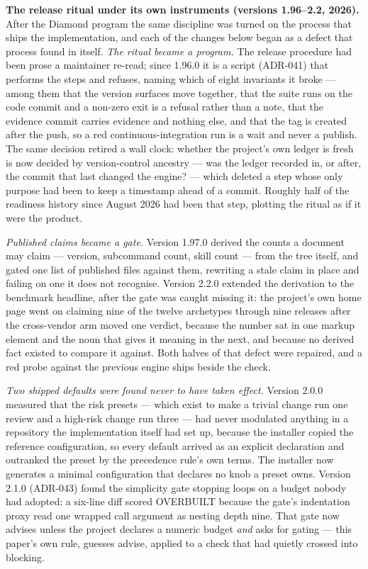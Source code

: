\documentclass[11pt]{article}
\begin{document}
\textbf{The release ritual under its own instruments (versions 1.96--2.2, 2026).}
After the Diamond program the same discipline was turned on the process that ships the
implementation, and each of the changes below began as a defect that process found in
itself. \emph{The ritual became a program.} The release procedure had been prose a
maintainer re-read; since 1.96.0 it is a script (ADR-041) that performs the steps and
refuses, naming which of eight invariants it broke --- among them that the version
surfaces move together, that the suite runs on the code commit and a non-zero exit is a
refusal rather than a note, that the evidence commit carries evidence and nothing else,
and that the tag is created after the push, so a red continuous-integration run is a
wait and never a publish. The same decision retired a wall clock: whether the project's
own ledger is fresh is now decided by version-control ancestry --- was the ledger
recorded in, or after, the commit that last changed the engine? --- which deleted a
step whose only purpose had been to keep a timestamp ahead of a commit. Roughly half of
the readiness history since August 2026 had been that step, plotting the ritual as if
it were the product.

\emph{Published claims became a gate.} Version 1.97.0 derived the counts a document may
claim --- version, subcommand count, skill count --- from the tree itself, and gated one
list of published files against them, rewriting a stale claim in place and failing on
one it does not recognise. Version 2.2.0 extended the derivation to the benchmark
headline, after the gate was caught missing it: the project's own home page went on
claiming nine of the twelve archetypes through nine releases after the cross-vendor arm
moved one verdict, because the number sat in one markup element and the noun that gives
it meaning in the next, and because no derived fact existed to compare it against. Both halves of
that defect were repaired, and a red probe against the previous engine ships beside the
check.

\emph{Two shipped defaults were found never to have taken effect.} Version 2.0.0
measured that the risk presets --- which exist to make a trivial change run one review
and a high-risk change run three --- had never modulated anything in a repository the
implementation itself had set up, because the installer copied the reference
configuration, so every default arrived as an explicit declaration and outranked the
preset by the precedence rule's own terms. The installer now generates a minimal
configuration that declares no knob a preset owns. Version 2.1.0 (ADR-043) found the
simplicity gate stopping loops on a budget nobody had adopted: a six-line diff scored
OVERBUILT because the gate's indentation proxy read one wrapped call argument as nesting
depth nine. That gate now advises unless the project declares a numeric budget
\emph{and} asks for gating --- this paper's own rule, guesses advise, applied to a check
that had quietly crossed into blocking.
\end{document}
